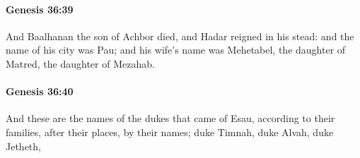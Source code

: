 		\paragraph{Genesis 36:39} %
			\label{GENESIS-36-39}

			And Baalhanan the son of Achbor died, and Hadar reigned in his stead: and the name of his city was Pau; and his wife's name was Mehetabel, the daughter of Matred, the daughter of Mezahab.


		\paragraph{Genesis 36:40} %
			\label{GENESIS-36-40}

			And these are the names of the dukes that came of Esau, according to their families, after their places, by their names; duke Timnah, duke Alvah, duke Jetheth,


